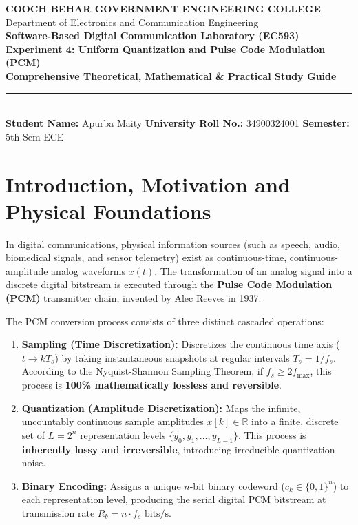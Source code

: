 \documentclass[11pt,a4paper]{article}
\begin{document}
\begin{center}
{\Large \textbf{\textcolor{primary}{COOCH BEHAR GOVERNMENT ENGINEERING COLLEGE}}}\\[1.5mm]
{\large Department of Electronics and Communication Engineering}\\[2.5mm]
{\Large \textbf{\textcolor{secondary}{Software-Based Digital Communication Laboratory (EC593)}}}\\[2mm]
{\LARGE \textbf{Experiment 4: Uniform Quantization and Pulse Code Modulation (PCM)}}\\[2mm]
{\large \textbf{Comprehensive Theoretical, Mathematical \& Practical Study Guide}}\\[2.5mm]
\rule{\linewidth}{1.0pt}\\[2mm]
\small \textbf{Student Name:} Apurba Maity \quad \textbf{University Roll No.:} 34900324001 \quad \textbf{Semester:} 5th Sem ECE
\end{center}

\vspace{3mm}

\section{Introduction, Motivation and Physical Foundations}
In digital communications, physical information sources (such as speech, audio, biomedical signals, and sensor telemetry) exist as continuous-time, continuous-amplitude analog waveforms $x(t)$. The transformation of an analog signal into a discrete digital bitstream is executed through the \textbf{Pulse Code Modulation (PCM)} transmitter chain, invented by Alec Reeves in 1937.

The PCM conversion process consists of three distinct cascaded operations:
\begin{enumerate}
    \item \textbf{Sampling (Time Discretization):} Discretizes the continuous time axis ($t \to k T_s$) by taking instantaneous snapshots at regular intervals $T_s = 1/f_s$. According to the Nyquist-Shannon Sampling Theorem, if $f_s \ge 2 f_{\max}$, this process is \textbf{100\% mathematically lossless and reversible}.
    \item \textbf{Quantization (Amplitude Discretization):} Maps the infinite, uncountably continuous sample amplitudes $x[k] \in \mathbb{R}$ into a finite, discrete set of $L = 2^n$ representation levels $\{y_0, y_1, \dots, y_{L-1}\}$. This process is \textbf{inherently lossy and irreversible}, introducing irreducible quantization noise.
    \item \textbf{Binary Encoding:} Assigns a unique $n$-bit binary codeword ($c_k \in \{0, 1\}^n$) to each representation level, producing the serial digital PCM bitstream at transmission rate $R_b = n \cdot f_s \text{ bits/s}$.
\end{enumerate}
\end{document}
